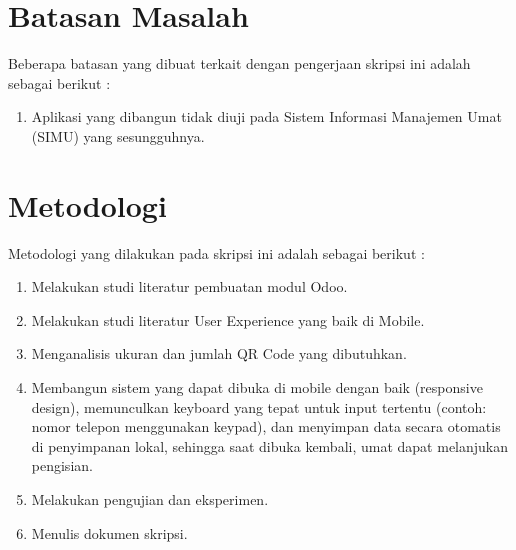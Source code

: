 \section{Batasan Masalah}
\label{sec:batasan}
Beberapa batasan yang dibuat terkait dengan pengerjaan skripsi ini adalah sebagai berikut :
\begin{enumerate}
	\item Aplikasi yang dibangun tidak diuji pada Sistem Informasi Manajemen Umat (SIMU) yang sesungguhnya.
\end{enumerate}


\section{Metodologi}
\label{sec:metlit}
Metodologi yang dilakukan pada skripsi ini adalah sebagai berikut :
\begin{enumerate}
	\item Melakukan studi literatur pembuatan modul Odoo.
	\item Melakukan studi literatur User Experience yang baik di Mobile.
	\item Menganalisis ukuran dan jumlah QR Code yang dibutuhkan.
	\item Membangun sistem yang dapat dibuka di mobile dengan baik (responsive design), memunculkan keyboard yang tepat untuk input tertentu (contoh: nomor telepon menggunakan keypad), dan menyimpan data secara otomatis di penyimpanan lokal, sehingga saat dibuka kembali, umat dapat melanjukan pengisian.
	\item Melakukan pengujian dan eksperimen.
	\item Menulis dokumen skripsi.
\end{enumerate}


